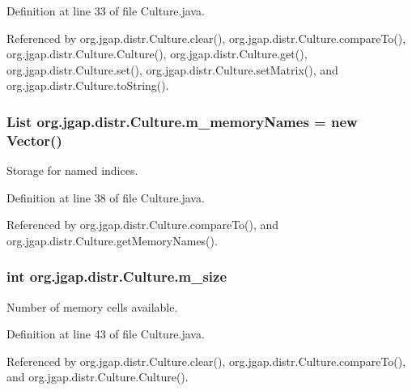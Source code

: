 Definition at line 33 of file Culture.\-java.



Referenced by org.\-jgap.\-distr.\-Culture.\-clear(), org.\-jgap.\-distr.\-Culture.\-compare\-To(), org.\-jgap.\-distr.\-Culture.\-Culture(), org.\-jgap.\-distr.\-Culture.\-get(), org.\-jgap.\-distr.\-Culture.\-set(), org.\-jgap.\-distr.\-Culture.\-set\-Matrix(), and org.\-jgap.\-distr.\-Culture.\-to\-String().

\hypertarget{classorg_1_1jgap_1_1distr_1_1_culture_a480cc144fcb71156b41d716498218adf}{
\subsubsection[{m\-\_\-memory\-Names}]{\setlength{\rightskip}{0pt plus 5cm}List org.\-jgap.\-distr.\-Culture.\-m\-\_\-memory\-Names = new Vector()\hspace{0.3cm}{\ttfamily [private]}}}\label{classorg_1_1jgap_1_1distr_1_1_culture_a480cc144fcb71156b41d716498218adf}
Storage for named indices. 

Definition at line 38 of file Culture.\-java.



Referenced by org.\-jgap.\-distr.\-Culture.\-compare\-To(), and org.\-jgap.\-distr.\-Culture.\-get\-Memory\-Names().

\hypertarget{classorg_1_1jgap_1_1distr_1_1_culture_ad1ab8e7a6abcc106751ea5c1cf315f6c}{
\subsubsection[{m\-\_\-size}]{\setlength{\rightskip}{0pt plus 5cm}int org.\-jgap.\-distr.\-Culture.\-m\-\_\-size\hspace{0.3cm}{\ttfamily [private]}}}\label{classorg_1_1jgap_1_1distr_1_1_culture_ad1ab8e7a6abcc106751ea5c1cf315f6c}
Number of memory cells available. 

Definition at line 43 of file Culture.\-java.



Referenced by org.\-jgap.\-distr.\-Culture.\-clear(), org.\-jgap.\-distr.\-Culture.\-compare\-To(), and org.\-jgap.\-distr.\-Culture.\-Culture().

